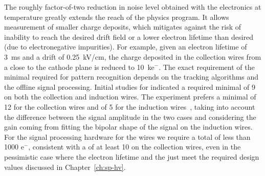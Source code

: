 The roughly factor-of-two reduction in noise level obtained with the  electronics at  temperature greatly 
extends the reach of the  physics program. %
It allows measurement of smaller charge deposits, which mitigates against the risk of %
inability to reach the desired drift field %
or %
a lower electron lifetime %
than desired (due to %
electronegative impurities). %
For example, given an electron lifetime of \SI{3}{ms} and a drift \efield
of \SI{0.25}{kV/cm}, the charge deposited in the collection wires from a 
 close to the cathode plane is reduced to \SI{10}{k}{e$^-$}.
The exact requirement of the minimal  required for pattern
recognition depends on the tracking algorithms and %
the offline signal processing.
Initial studies for  indicated %
a required minimal  of \num{9} 
on both the collection and induction wires. %
The 
 experiment prefers a minimal  of \num{12} for the
collection wires and of \num{5} for the induction wires~\cite{bib:sbnddoc1921}, taking into account
the difference between the signal amplitude in the two cases and considering %
the gain coming from fitting the bipolar shape of the signal on the
induction wires. 
For the signal processing hardware for the  wires we require 
a total  of less than 1000 e$^-$, consistent with a 
of at least 10 on the collection wires, 
even in the pessimistic case  where the electron lifetime and the \efield just meet the required design values discussed in Chapter~\ref{ch:sp-hv}.

